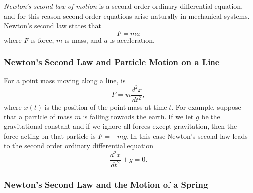 \documentclass{ximera}
\begin{document}
{\em Newton's second law of motion\/} is a second order ordinary
differential equation, and for this reason second order equations arise
naturally in mechanical systems.  Newton's second law states that
\begin{equation}  \label{e:2ndlaw}
F=ma
\end{equation}
where $F$ is force, $m$ is mass,
and $a$ is acceleration.

\subsubsection*{Newton's Second Law and Particle Motion on a Line}

For a point mass moving along a line,  is
\begin{equation} \label{E:F=ma}
F=m\frac{d^2x}{dt^2},
\end{equation}
where $x(t)$ is the position of the point mass at time $t$.
For example, suppose that a particle of mass $m$ is falling towards
the earth.  If we let $g$ be the gravitational constant and if we
ignore all forces except gravitation, then the force acting on that
particle is $F=-mg$.  In this case Newton's second law leads to the
second order ordinary differential equation
\begin{equation} \label{e:pointpart}
\frac{d^2x}{dt^2}+g=0.
\end{equation}

\subsubsection*{Newton's Second Law and the Motion of a Spring}
 
\end{document}
